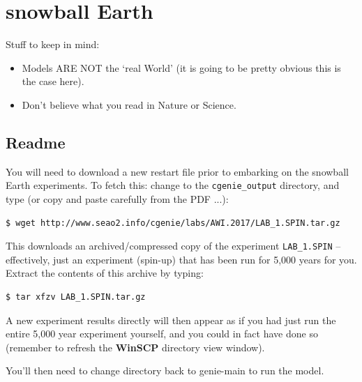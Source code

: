 \documentclass[11pt,fleqn]{book} %
\begin{document}
\chapter{snowball Earth}

\hfill \break

\noindent Stuff to keep in mind:

\begin{itemize}
\item Models ARE NOT the ‘real World’ (it is going to be pretty obvious this is the case here).
\item Don’t believe what you read in Nature or Science.
\end{itemize}


\newpage


\section*{Readme}

You will need to download a new restart file prior to embarking on the snowball Earth experiments.
To fetch this: change to the \texttt{cgenie\_output} directory, and type (or copy and paste carefully from the PDF ...):

\begin{verbatim}
$ wget http://www.seao2.info/cgenie/labs/AWI.2017/LAB_1.SPIN.tar.gz
\end{verbatim}

This downloads an archived/compressed copy of the experiment \texttt{LAB\_1.SPIN} – effectively, just an experiment (spin-up) that has been run for 5,000 years for you. Extract the contents of this archive by typing:

\begin{verbatim}
$ tar xfzv LAB_1.SPIN.tar.gz 
\end{verbatim}

A new experiment results directly will then appear as if you had just run the entire 5,000 year experiment yourself, and you could in fact have done so (remember to refresh the \textbf{WinSCP} directory view window).

You’ll then need to change directory back to genie-main to run the model.


\newpage
\end{document}
